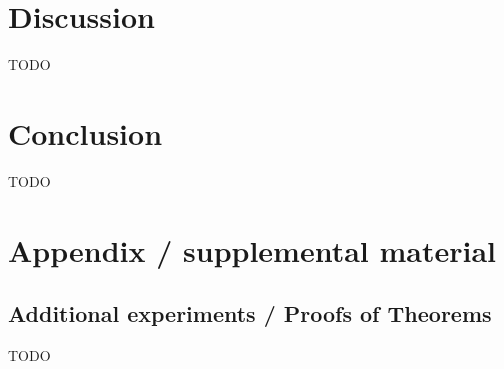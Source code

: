 \documentclass{article}
\begin{document}
\section{Discussion}\label{sec:disc}

TODO

\section{Conclusion}\label{sec:concl}

TODO







\newpage
\appendix
\section{Appendix / supplemental material}\label{app}

\subsection{Additional experiments / Proofs of Theorems}\label{app:exp}

TODO
\end{document}
